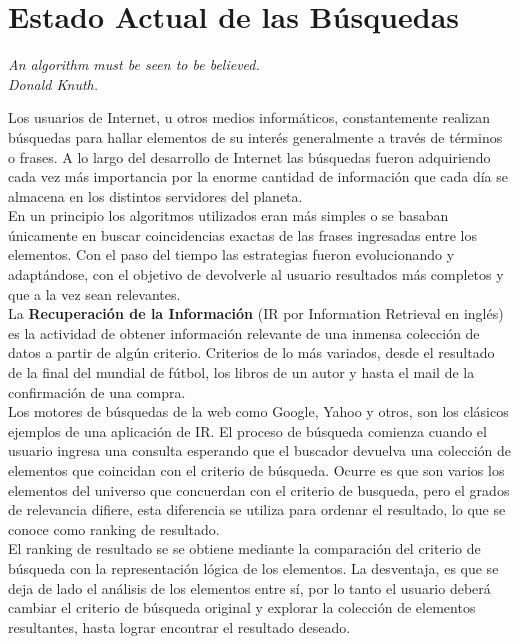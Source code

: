 \section{Estado Actual de las Búsquedas}
{\begin{small}%
\begin{flushright}%
\it An algorithm must be seen to be believed.\\Donald Knuth.
\end{flushright}%
\end{small}%
\vspace{.5cm}}
Los usuarios de Internet, u otros medios informáticos, constantemente realizan búsquedas para hallar elementos de su interés generalmente a través de términos o frases. A lo largo del desarrollo de Internet las búsquedas fueron adquiriendo cada vez más importancia por la enorme cantidad de información que cada día se almacena en los distintos servidores del planeta.\\
En un principio los algoritmos utilizados eran más simples o se basaban únicamente en buscar coincidencias exactas de las frases ingresadas entre los elementos. Con el paso del tiempo las estrategias fueron evolucionando y adaptándose, con el objetivo de devolverle al usuario resultados más completos y que a la vez sean relevantes.\\
La \textbf{Recuperación de la Información} (IR por Information Retrieval en inglés) es la actividad de obtener información relevante de una inmensa colección de datos a partir de algún criterio. Criterios de lo más variados, desde el resultado de la final del mundial de fútbol, los libros de un autor y hasta el mail de la confirmación de una compra.\\
Los motores de búsquedas de la web como Google, Yahoo y otros, son los clásicos ejemplos de una aplicación de IR. El proceso de búsqueda comienza cuando el usuario ingresa una consulta esperando que el buscador devuelva una colección de elementos que coincidan con el criterio de búsqueda. Ocurre es que son varios los elementos del universo que concuerdan con el criterio de busqueda, pero el grados de relevancia difiere, esta diferencia se utiliza para ordenar el resultado, lo que se conoce como ranking de resultado.\\
El ranking de resultado se se obtiene mediante la comparación del criterio de búsqueda con la representación lógica de los elementos. La desventaja, es que se deja de lado el análisis de los elementos entre sí, por lo tanto el usuario deberá cambiar el criterio de búsqueda original y explorar la colección de elementos  resultantes, hasta lograr encontrar el resultado deseado.\\
